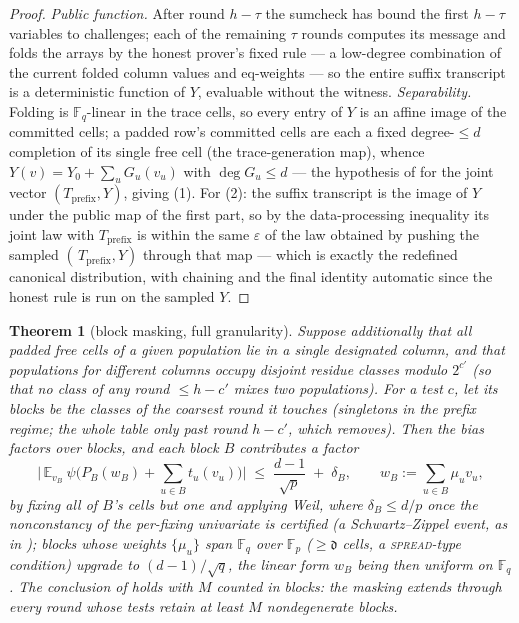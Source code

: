 \documentclass{article}
\newcommand{\Fp}{\mathbb{F}_p}
\newcommand{\Fq}{\mathbb{F}_q}
\newcommand{\extdeg}{\mathfrak{d}}
\newtheorem{theorem}{Theorem}[section]
\theoremstyle{definition}
\begin{document}
\begin{proof}
\emph{Public function.} After round $h - \tau$ the sumcheck has bound the first $h - \tau$ variables to challenges; each of the remaining $\tau$ rounds computes its message and folds the arrays by the honest prover's fixed rule --- a low-degree combination of the current folded column values and eq-weights --- so the entire suffix transcript is a deterministic function of $Y$, evaluable without the witness. \emph{Separability.} Folding is $\Fq$-linear in the trace cells, so every entry of $Y$ is an affine image of the committed cells; a padded row's committed cells are each a fixed degree-$\leq d$ completion of its single free cell (the trace-generation map), whence $Y(v) = Y_0 + \sum_u G_u(v_u)$ with $\deg G_u \leq d$ --- the hypothesis of  for the joint vector $(T_{\mathrm{prefix}}, Y)$, giving (1). For (2): the suffix transcript is the image of $Y$ under the public map of the first part, so by the data-processing inequality its joint law with $T_{\mathrm{prefix}}$ is within the same $\varepsilon$ of the law obtained by pushing the sampled $(\,T_{\mathrm{prefix}}, Y)$ through that map --- which is exactly the redefined canonical distribution, with chaining and the final identity automatic since the honest rule is run on the sampled $Y$.
\end{proof}

\begin{theorem}[block masking, full granularity]\label{thm:blocks}
Suppose additionally that all padded free cells of a given population lie in a \emph{single designated column}, and that populations for different columns occupy disjoint residue classes modulo $2^{c'}$ (so that no class of any round $\leq h - c'$ mixes two populations). For a test $c$, let its \emph{blocks} be the classes of the coarsest round it touches (singletons in the prefix regime; the whole table only past round $h - c'$, which  removes). Then the bias factors over blocks, and each block $B$ contributes a factor
\[
\Big|\,\mathbb{E}_{v_B}\ \psi\big(P_B(w_B) + \textstyle\sum_{u \in B} t_u(v_u)\big)\Big| \;\leq\; \frac{d-1}{\sqrt p} \;+\; \delta_B , \qquad w_B := \textstyle\sum_{u \in B} \mu_u v_u ,
\]
by fixing all of $B$'s cells but one and applying Weil, where $\delta_B \leq d/p$ once the nonconstancy of the per-fixing univariate is certified (a Schwartz--Zippel event, as in ); blocks whose weights $\{\mu_u\}$ span $\Fq$ over $\Fp$ ($\geq \extdeg$ cells, a \textsc{spread}-type condition) upgrade to $(d-1)/\sqrt{q}$, the linear form $w_B$ being then uniform on $\Fq$. The conclusion of  holds with $M$ counted in \emph{blocks}: the masking extends through every round whose tests retain at least $M$ nondegenerate blocks.
\end{theorem}
\end{document}
